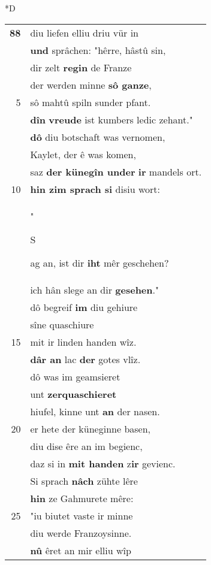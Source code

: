 \documentclass[8pt,a4paper,notitlepage]{article}
\begin{document}
\begin{table}[ht]
\begin{minipage}[t]{0.5\linewidth}
\small
\begin{center}*D
\end{center}
\begin{tabular}{rl}
\textbf{88} & diu liefen elliu driu vür in\\ 
 & \textbf{und} sprâchen: "hêrre, hâstû sin,\\ 
 & dir zelt \textbf{regin} de Franze\\ 
 & der werden minne \textbf{sô ganze},\\ 
5 & sô mahtû spiln sunder pfant.\\ 
 & \textbf{dîn} \textbf{vreude} ist kumbers ledic zehant."\\ 
 & \textbf{dô} diu botschaft was vernomen,\\ 
 & Kaylet, der ê was komen,\\ 
 & saz \textbf{der künegîn under} \textbf{ir} mandels ort.\\ 
10 & \textbf{hin zim sprach si} disiu wort:\\ 
 & "\begin{large}S\end{large}ag an, ist dir \textbf{iht} mêr geschehen?\\ 
 & ich hân slege an dir \textbf{gesehen}."\\ 
 & dô begreif \textbf{im} diu gehiure\\ 
 & sîne quaschiure\\ 
15 & mit ir linden handen wîz.\\ 
 & \textbf{dâr an} lac \textbf{der} gotes vlîz.\\ 
 & dô was im geamsieret\\ 
 & unt \textbf{zerquaschieret}\\ 
 & hiufel, kinne unt \textbf{an} der nasen.\\ 
20 & er hete der küneginne basen,\\ 
 & diu dise êre an im begienc,\\ 
 & daz si in \textbf{mit handen} z\textbf{ir} gevienc.\\ 
 & Si sprach \textbf{nâch} zühte lêre\\ 
 & \textbf{hin} ze Gahmurete mêre:\\ 
25 & "iu biutet vaste ir minne\\ 
 & diu werde Franzoysinne.\\ 
 & \textbf{nû} êret an mir elliu wîp\\ 

\end{tabular}
\end{minipage}
\end{table}
\end{document}
